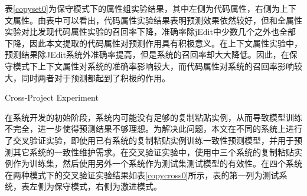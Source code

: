 表\ref{copyset0}为保守模式下的属性组实验结果，其中左侧为代码属性，右侧为上下文属性。由表中可以看出，代码属性实验结果表明预测效果依然较好，但和全属性实验对比发现代码属性实验的召回率下降，准确率除jEdit中少数几个之外也全部下降，因此本文提取的代码属性对预测作用具有积极意义。在上下文属性实验中，预测结果除JEdit系统外准确率提高，但是系统的召回率却大大降低。因此，在保守模式下上下文属性对系统的准确率影响较大，而代码属性对系统的召回率影响较大，同时两者对于预测都起到了积极的作用。



{Cross-Project Experiment}

在系统开发的初始阶段，系统内可能没有足够的复制粘贴实例，从而导致模型训练不完全，进一步使得预测结果不够理想。为解决此问题，本文在不同的系统上进行了交叉验证实验，即使用已有系统的复制粘贴实例训练一致性预测模型，并用于预测其它系统的一致性维护需求。在交叉验证实验中，使用中三个系统的复制粘贴实例作为训练集，然后使用另外一个系统作为测试集测试模型的有效性。在四个系统在两种模式下的交叉验证实验结果如表\ref{copycross0}所示，表的第一列为测试系统，表左侧为保守模式，右侧为激进模式。

